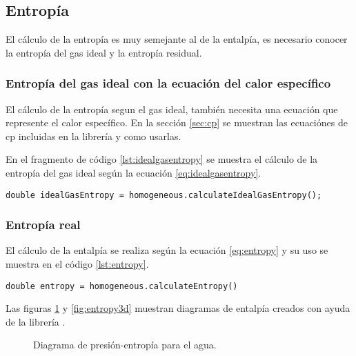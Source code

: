 \subsection{Entropía}

	El cálculo de la entropía es muy semejante al de la entalpía, es necesario conocer la entropía del gas ideal y la entropía residual.

\subsubsection{Entropía del gas ideal con la ecuación del calor específico}

	El cálculo de la entropía segun el gas ideal, también necesita una ecuación que represente el calor específico. En la sección \ref{sec:cp} se muestran las ecuaciónes de cp incluidas en la librería y como usarlas.

	En el fragmento de código \ref{lst:idealgasentropy} se muestra el cálculo de la entropía del gas ideal según la ecuación \ref{eq:idealgasentropy}. 

	\begin{lstlisting}[label={lst:idealgasentropy},caption={Cálculo de la entropía absoluta del gas ideal.}]
	double idealGasEntropy = homogeneous.calculateIdealGasEntropy();
	\end{lstlisting}

\subsubsection{Entropía real}

	El cálculo de la entalpía se realiza según la ecuación \ref{eq:entropy} y su uso se muestra en el código \ref{lst:entropy}.

\begin{lstlisting}[label={lst:entropy},caption={Cálculo de la entropía absoluta.}]
	double entropy = homogeneous.calculateEntropy()
\end{lstlisting}

	Las figuras \ref{fig:2dentropy} y \ref{fig:entropy3d} muestran diagramas de entalpía creados con ayuda de la librería \Materia.


\begin{figure}[!h]
	\centering	
	\caption{Diagrama de presión-entropía para el agua.}\label{fig:2dentropy}
\end{figure}


